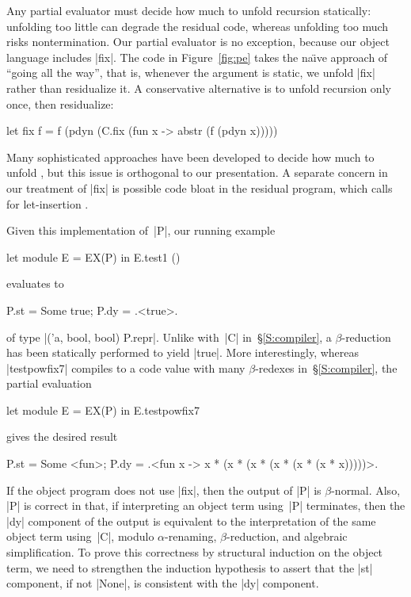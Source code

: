 Any partial evaluator must decide how much to unfold recursion
statically: unfolding too little can degrade the residual code, whereas
unfolding too much risks nontermination.  Our partial evaluator is no
exception, because our object language includes |fix|.  The code in
Figure~\ref{fig:pe} takes the na\"\i ve approach of ``going all the
way'', that is, whenever the 
argument is static, we unfold |fix| rather than residualize it.
A conservative alternative is to unfold recursion only once, then residualize:
\begin{code}
let fix f = f (pdyn (C.fix (fun x -> abstr (f (pdyn x)))))
\end{code}
Many sophisticated approaches have been developed to decide how much to unfold
\citep{Jones-Mix,jones-partial}, but this issue is 
orthogonal to our presentation.
A separate concern in our treatment of |fix| is possible code bloat in
the residual program, which calls for let-insertion
\citep{BondorfDanvy,SwadiTahaKiselyovPasalic2006}.


Given this implementation of~|P|, our running example
\begin{code}
let module E = EX(P) in E.test1 ()
\end{code}
evaluates to
\begin{code}
{P.st = Some true; P.dy = .<true>.}
\end{code}
of type |('a, bool, bool) P.repr|.  Unlike with~|C| in~\S\ref{S:compiler},
a $\beta$-reduction has been statically performed to yield |true|.  More
interestingly, whereas |testpowfix7| compiles to a code value with many
$\beta$-redexes in~\S\ref{S:compiler}, the partial evaluation
\begin{code}
let module E = EX(P) in E.testpowfix7
\end{code}
gives the desired result
\begin{code}
{P.st = Some <fun>;
 P.dy = .<fun x -> x * (x * (x * (x * (x * (x * x)))))>.}
\end{code}
If the object program does not use |fix|, then the output of |P|
is $\beta$-normal.
Also, |P| is correct in that, if interpreting an
object term using~|P| terminates, then the |dy| component of the output is
equivalent to the interpretation of the same object term using~|C|, modulo
$\alpha$-renaming, $\beta$-reduction, and algebraic simplification.  To prove
this correctness by structural induction on the object term, we need to
strengthen the induction hypothesis to assert that the |st| component, if not
|None|, is consistent with the |dy| component.

